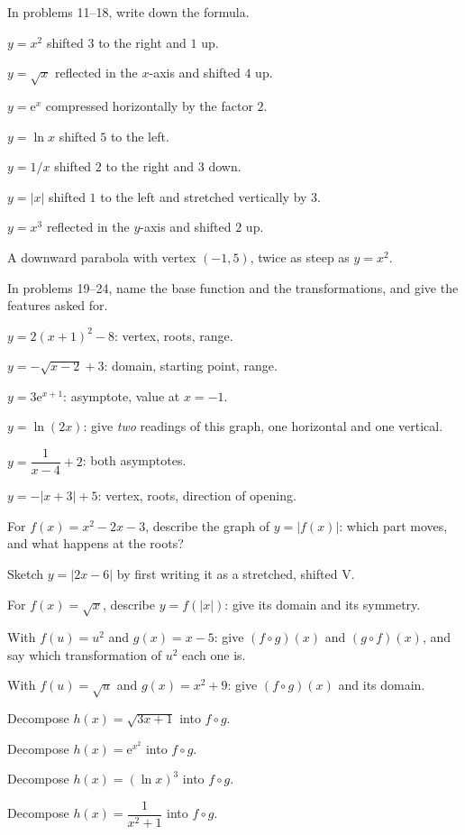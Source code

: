 In problems 11--18, write down the formula.

\begin{problems}[resume]
  \item $y=x^{2}$ shifted $3$ to the right and $1$ up.
  \item $y=\sqrt{x}$ reflected in the $x$-axis and shifted $4$ up.
  \item $y=\mathrm{e}^{x}$ compressed horizontally by the factor $2$.
  \item $y=\ln x$ shifted $5$ to the left.
  \item $y=1/x$ shifted $2$ to the right and $3$ down.
  \item $y=|x|$ shifted $1$ to the left and stretched vertically by $3$.
  \item $y=x^{3}$ reflected in the $y$-axis and shifted $2$ up.
  \item A downward parabola with vertex $(-1,5)$, twice as steep as
        $y=x^{2}$.
\end{problems}

In problems 19--24, name the base function and the transformations, and
give the features asked for.

\begin{problems}[resume]
  \item $y=2(x+1)^{2}-8$: vertex, roots, range.
  \item $y=-\sqrt{x-2}+3$: domain, starting point, range.
  \item $y=3\mathrm{e}^{x+1}$: asymptote, value at $x=-1$.
  \item $y=\ln(2x)$: give \emph{two} readings of this graph, one
        horizontal and one vertical.
  \item $y=\dfrac{1}{x-4}+2$: both asymptotes.
  \item $y=-|x+3|+5$: vertex, roots, direction of opening.
\end{problems}

\begin{problems}[resume]
  \item For $f(x)=x^{2}-2x-3$, describe the graph of $y=|f(x)|$: which
        part moves, and what happens at the roots?
  \item Sketch $y=|2x-6|$ by first writing it as a stretched, shifted V.
  \item For $f(x)=\sqrt{x}$, describe $y=f(|x|)$: give its domain and its
        symmetry.
  \item With $f(u)=u^{2}$ and $g(x)=x-5$: give $(f\circ g)(x)$ and
        $(g\circ f)(x)$, and say which transformation of $u^{2}$ each one
        is.
  \item With $f(u)=\sqrt{u}$ and $g(x)=x^{2}+9$: give $(f\circ g)(x)$ and
        its domain.
  \item Decompose $h(x)=\sqrt{3x+1}$ into $f\circ g$.
  \item Decompose $h(x)=\mathrm{e}^{x^{2}}$ into $f\circ g$.
  \item Decompose $h(x)=(\ln x)^{3}$ into $f\circ g$.
  \item Decompose $h(x)=\dfrac{1}{x^{2}+1}$ into $f\circ g$.
\end{problems}


